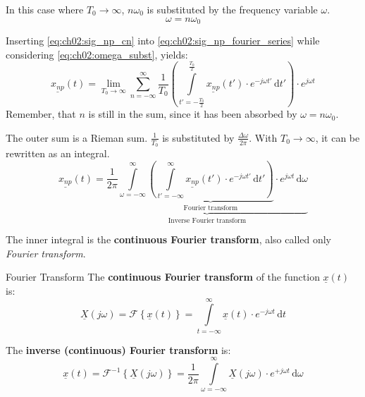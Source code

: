 \begin{refsection}
In this case where $T_0 \rightarrow \infty$, $n \omega_0$ is substituted by the frequency variable $\omega$.
\begin{equation}
	\omega = n \omega_0
	\label{eq:ch02:omega_subst}
\end{equation}

Inserting \eqref{eq:ch02:sig_np_cn} into \eqref{eq:ch02:sig_np_fourier_series} while considering \eqref{eq:ch02:omega_subst}, yields:
\begin{equation}
	\underline{x_{np}}(t) = \lim\limits_{T_0 \rightarrow \infty} \sum\limits_{n = -\infty}^{\infty} \frac{1}{T_0} \left( \int\limits_{t' = -\frac{T_0}{2}}^{\frac{T_0}{2}} \underline{x_{np}}(t') \cdot e^{-j \omega t'} \, \mathrm{d} t' \right) \cdot e^{j \omega t}
\end{equation}
Remember, that $n$ is still in the sum, since it has been absorbed by $\omega = n \omega_0$.

The outer sum is a Rieman sum. $\frac{1}{T_0}$ is substituted by $\frac{\Delta \omega}{2 \pi}$. With $T_0 \rightarrow \infty$, it can be rewritten as an integral.
\begin{equation}
	\underline{x_{np}}(t) = \underbrace{\frac{1}{2 \pi} \int\limits_{\omega = -\infty}^{\infty} \underbrace{\left( \int\limits_{t' = -\infty}^{\infty} \underline{x_{np}}(t') \cdot e^{-j \omega t'} \, \mathrm{d} t' \right)}_{\text{Fourier transform}} \cdot e^{j \omega t} \, \mathrm{d} \omega}_{\text{Inverse Fourier transform}}
\end{equation}

The inner integral is the \textbf{continuous Fourier transform}, also called only  \emph{Fourier transform}. 

\begin{definition}{Fourier Transform}
	The  \textbf{continuous Fourier transform} of the function $\underline{x}(t)$ is:
	\begin{equation}
		\underline{X}(j \omega) = \mathcal{F} \left\{\underline{x}(t)\right\} = \int\limits_{t = -\infty}^{\infty} \underline{x}(t) \cdot e^{-j \omega t} \, \mathrm{d} t
		\label{eq:ch02:def_fourier_transform}
	\end{equation}%
	
	The   \textbf{inverse (continuous) Fourier transform} is:
	\begin{equation}
		\underline{x}(t) = \mathcal{F}^{-1} \left\{\underline{X}(j \omega)\right\} = \frac{1}{2 \pi} \int\limits_{\omega = -\infty}^{\infty} \underline{X}(j \omega) \cdot e^{+j \omega t} \, \mathrm{d} \omega
		\label{eq:ch02:def_inv_fourier_transform}
	\end{equation}%
\end{definition}


\end{refsection}
